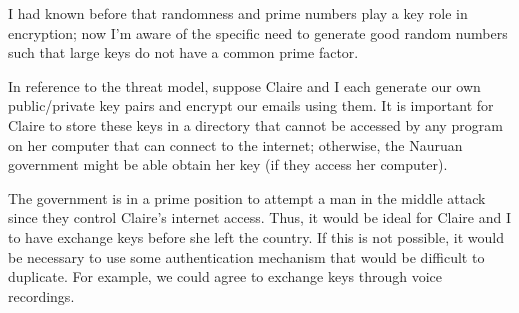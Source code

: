\documentclass{article}
\theoremstyle{definition}
\renewcommand{\>}{\rangle}
\newcommand{\<}{\langle}
\begin{document}
I had known before that randomness and prime numbers play a key role in
encryption; now I'm aware of the specific need to generate good random numbers
such that large keys do not have a common prime factor.

In reference to the threat model, suppose Claire and I each generate our
own public/private key pairs and encrypt our emails using them. It is important
for Claire to store these keys in a directory that cannot be accessed by any
program on her computer that can connect to the internet; otherwise, the Nauruan
government might be able obtain her key (if they access her computer).

The government is in a prime position to attempt a man in the middle attack
since they control Claire's internet access. Thus, it would be ideal for
Claire and I to have exchange keys before she left the country. If this is
not possible, it would be necessary to use some authentication mechanism
that would be difficult to duplicate. For example, we could agree to exchange
keys through voice recordings.
\end{document}
